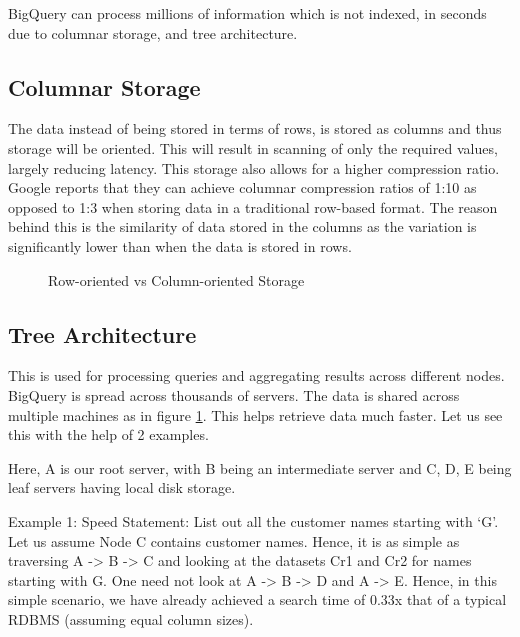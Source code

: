 \documentclass[9pt,twocolumn,twoside]{../../styles/osajnl}
\begin{document}
BigQuery\cite{www-bigquery} can process millions of information which
is not indexed, in seconds due to columnar storage, and tree
architecture.

\subsection{Columnar Storage}
The data instead of being stored in terms of rows, is stored as
columns and thus storage will be oriented. This will result in
scanning of only the required values, largely reducing latency. This
storage also allows for a higher compression ratio. Google reports
\cite{www-rowvscolumnstorage} that they can achieve columnar
compression ratios of 1:10 as opposed to 1:3 when storing data in a
traditional row-based format. The reason behind this is the similarity
of data stored in the columns as the variation is significantly lower
than when the data is stored in rows.

\begin{figure}[htbp]
\centering
{}
\caption{\cite{www-rowvscolumnstorage} Row-oriented vs Column-oriented Storage}
\label{fig:rowvscolumnarstorage}
\end{figure}

\subsection{Tree Architecture}
This is used for processing queries and aggregating results across
different nodes. BigQuery is spread across thousands of servers. The
data is shared across multiple machines as in figure
\ref{fig:rowvscolumnarstorage}. This helps retrieve data much
faster. Let us see this with the help of 2
examples\cite{www-rowvscolumnstorage}.

\noindent
Here, A is our root server, with B being an intermediate server and C,
D, E being leaf servers having local disk storage.\newline

\noindent
Example 1: Speed \newline
Statement: List out all the customer names starting with ‘G’.\newline
\noindent
Let us assume Node C contains customer names.  Hence, it is as simple
as traversing A -> B -> C and looking at the datasets Cr1 and Cr2 for
names starting with G. One need not look at A -> B -> D and A ->
E. Hence, in this simple scenario, we have already achieved a search
time of 0.33x that of a typical RDBMS (assuming equal column sizes).\newline
\end{document}
